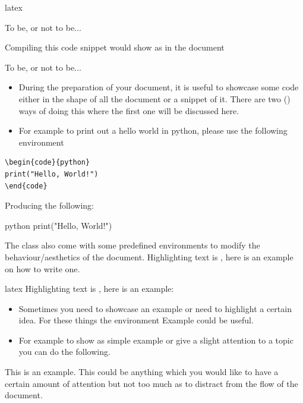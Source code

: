 \documentclass[minted, draw]{../tex/hebdomon}
\begin{document}
\begin{code}{latex}
\begin{excerpt}
  To be, or not to be...
\end{excerpt}
\end{code}
%
\begin{hgitemize}
	\item[] Compiling this code snippet would show as in the document
\end{hgitemize}
%
\begin{excerpt}
	To be, or not to be...
\end{excerpt}
%
\begin{itemize}[leftmargin=!,labelindent=-29.2pt]
	\item[\pcode{code}] During the preparation of your document, it is useful to showcase
	      some code either in the shape of all the document or a snippet of it.
	      There are two () ways of doing this where the first one will be discussed here.
	\item[] For example to print out a hello world in python, please use the following environment
\end{itemize}
%
\begin{verbatim}
\begin{code}{python}
print("Hello, World!")
\end{code}
\end{verbatim}
%
Producing the following:
%
\begin{code}{python}
print("Hello, World!")
\end{code}
%
The class also come with some predefined environments to modify the behaviour/aesthetics of the document.
%
Highlighting text is , here is an example on how to write one.

\begin{code}{latex}
Highlighting text is , here is an example:
\end{code}

\begin{itemize}[leftmargin=!,labelindent=-29.2pt]
	\item[\pcode{example}] Sometimes you need to showcase an example or
	      need to highlight a certain idea.
	      For these things the environment Example could be useful.
	\item[] For example to show as simple example or give a slight attention to a topic you can do the following.
\end{itemize}

\begin{example}
	This is an example. This could be anything which you would like to have a certain amount of
	attention but not too much as to distract from the flow of the document.
\end{example}
\end{document}
